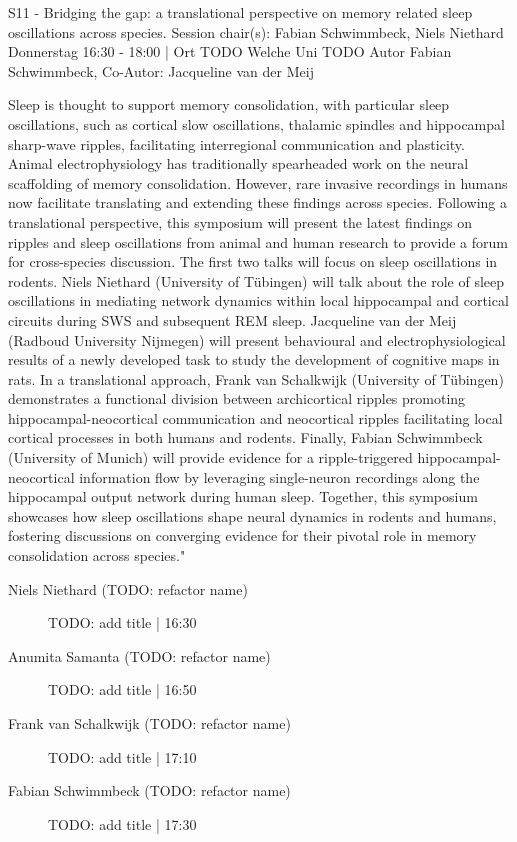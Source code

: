 
            \begin{symposium}
            {S11 - Bridging the gap: a translational perspective on memory related sleep oscillations across species.}
            {Session chair(s): Fabian Schwimmbeck, Niels Niethard }
            {Donnerstag 16:30 - 18:00 | Ort TODO}
            {Welche Uni TODO}
            Autor Fabian Schwimmbeck, Co-Autor: Jacqueline van der Meij

Sleep is thought to support memory consolidation, with particular sleep oscillations, such as cortical slow oscillations, thalamic spindles and hippocampal sharp-wave ripples, facilitating interregional communication and plasticity. Animal electrophysiology has traditionally spearheaded work on the neural scaffolding of memory consolidation. However, rare invasive recordings in humans now facilitate translating and extending these findings across species.
Following a translational perspective, this symposium will present the latest findings on ripples and sleep oscillations from animal and human research to provide a forum for cross-species discussion.
The first two talks will focus on sleep oscillations in rodents. Niels Niethard (University of Tübingen) will talk about the role of sleep oscillations in mediating network dynamics within local hippocampal and cortical circuits during SWS and subsequent REM sleep.
Jacqueline van der Meij (Radboud University Nijmegen) will present behavioural and electrophysiological results of a newly developed task to study the development of cognitive maps in rats.
In a translational approach, Frank van Schalkwijk (University of Tübingen) demonstrates a functional division between archicortical ripples promoting hippocampal-neocortical communication and neocortical ripples facilitating local cortical processes in both humans and rodents.
Finally, Fabian Schwimmbeck (University of Munich) will provide evidence for a ripple-triggered hippocampal-neocortical information flow by leveraging single-neuron recordings along the hippocampal output network during human sleep.
Together, this symposium showcases how sleep oscillations shape neural dynamics in rodents and humans, fostering discussions on converging evidence for their pivotal role in memory consolidation across species."
            \begin{description}    
            
                \item [Niels Niethard  (TODO: refactor name)] TODO: add title \textcolor{mygray}{ | 16:30}    
                
                \item [Anumita Samanta (TODO: refactor name)] TODO: add title \textcolor{mygray}{ | 16:50}    
                
                \item [Frank van Schalkwijk (TODO: refactor name)] TODO: add title \textcolor{mygray}{ | 17:10}    
                
                \item [Fabian Schwimmbeck (TODO: refactor name)] TODO: add title \textcolor{mygray}{ | 17:30}    
                
            \end{description} 
            \end{symposium}
            